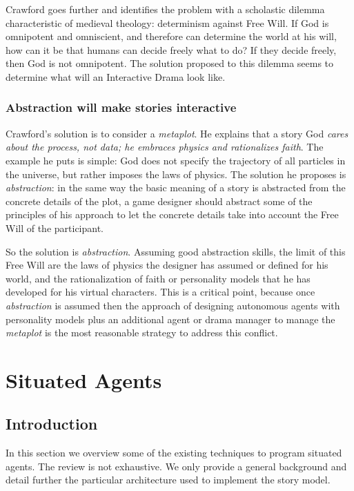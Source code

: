 \documentclass[
		twoside,openright,titlepage,numbers=noenddot,manychapters,
		headinclude,%
                footinclude=false,cleardoublepage=empty,
                BCOR=5mm,
		fontsize=11pt, %
                 enabledeprecatedfontcommands]{scrreprt}
\begin{document}
Crawford  goes further \cite[page 51]{crawford2004cci}
 and identifies the problem with a scholastic dilemma characteristic of medieval theology: determinism against Free Will. If God is omnipotent and omniscient, and therefore can determine the world at his will, how can it be that humans can decide freely what to do? If they decide freely, then God is not omnipotent. The solution proposed to this dilemma seems to determine what will an Interactive Drama look like.

\subsubsection{ Abstraction will make stories interactive}

Crawford's solution is to consider a \emph{metaplot}. He explains that a story God \emph{cares about the process, not data; he embraces physics and rationalizes faith}. The example he puts is simple: God does not specify the trajectory of all particles in the universe, but rather imposes the laws of physics. The solution he proposes is \emph{abstraction}: in the same way the basic meaning of a story is abstracted from the concrete details of the plot, a game designer should abstract some of the principles of his approach to let the concrete details take into account the Free Will of the participant. 

So the solution is \emph{abstraction}. Assuming good abstraction skills, the limit of this Free Will are the laws of physics the designer has assumed or defined for his world, and the rationalization of faith or personality models that he has developed for his virtual characters. 
This is a critical point, because once \emph{abstraction} is assumed then the approach of designing autonomous agents with personality models plus an additional agent or drama manager to manage the \emph{metaplot} is the most reasonable strategy to address this conflict. 




\section{Situated Agents}
\label{soa_sa}

\subsection{Introduction}
In this section we overview some of the existing techniques to program situated agents.
The review is not exhaustive. We only provide a general background and detail further the particular architecture used to implement the story model.
\\
\end{document}

